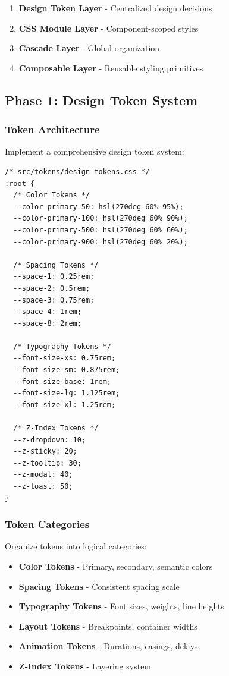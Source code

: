 \documentclass[11pt]{article}
\begin{document}
\begin{enumerate}
\item \textbf{Design Token Layer} - Centralized design decisions
\item \textbf{CSS Module Layer} - Component-scoped styles
\item \textbf{Cascade Layer} - Global organization
\item \textbf{Composable Layer} - Reusable styling primitives
\end{enumerate}

\subsection{Phase 1: Design Token System}

\subsubsection{Token Architecture}

Implement a comprehensive design token system:

\begin{lstlisting}[style=css]
/* src/tokens/design-tokens.css */
:root {
  /* Color Tokens */
  --color-primary-50: hsl(270deg 60% 95%);
  --color-primary-100: hsl(270deg 60% 90%);
  --color-primary-500: hsl(270deg 60% 60%);
  --color-primary-900: hsl(270deg 60% 20%);
  
  /* Spacing Tokens */
  --space-1: 0.25rem;
  --space-2: 0.5rem;
  --space-3: 0.75rem;
  --space-4: 1rem;
  --space-8: 2rem;
  
  /* Typography Tokens */
  --font-size-xs: 0.75rem;
  --font-size-sm: 0.875rem;
  --font-size-base: 1rem;
  --font-size-lg: 1.125rem;
  --font-size-xl: 1.25rem;
  
  /* Z-Index Tokens */
  --z-dropdown: 10;
  --z-sticky: 20;
  --z-tooltip: 30;
  --z-modal: 40;
  --z-toast: 50;
}
\end{lstlisting}

\subsubsection{Token Categories}

Organize tokens into logical categories:

\begin{itemize}
\item \textbf{Color Tokens} - Primary, secondary, semantic colors
\item \textbf{Spacing Tokens} - Consistent spacing scale
\item \textbf{Typography Tokens} - Font sizes, weights, line heights
\item \textbf{Layout Tokens} - Breakpoints, container widths
\item \textbf{Animation Tokens} - Durations, easings, delays
\item \textbf{Z-Index Tokens} - Layering system
\end{itemize}
\end{document}
